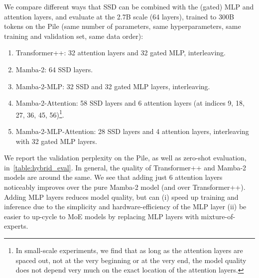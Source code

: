 \documentclass{article}
\begin{document}
We compare different ways that SSD can be combined with the (gated) MLP and attention layers, and evaluate at the 2.7B scale (64 layers), trained to 300B tokens on the Pile (same
number of parameters, same hyperparameters, same training and validation set, same data order):
\begin{enumerate}
\item Transformer++: 32 attention layers and 32 gated MLP, interleaving.
\item Mamba-2: 64 SSD layers.
\item Mamba-2-MLP: 32 SSD and 32 gated MLP layers, interleaving.
\item Mamba-2-Attention: 58 SSD layers and 6 attention layers (at indices 9, 18, 27, 36, 45, 56)\footnote{In small-scale experiments, we find that as long as the attention layers are spaced out, not at the very beginning or at the very end, the model quality does not depend very much on the exact location of the attention layers.}.
\item Mamba-2-MLP-Attention: 28 SSD layers and 4 attention layers, interleaving with 32 gated MLP layers.
\end{enumerate}
We report the validation perplexity on the Pile, as well as zero-shot evaluation, in~\cref{table:hybrid_eval}.
In general, the quality of Transformer++ and Mamba-2 models are around the same.
We see that adding just 6 attention layers noticeably improves over the pure Mamba-2 model (and over Transformer++). Adding MLP layers reduces model quality, but can (i) speed up training and inference due to the simplicity and hardware-efficiency of the MLP layer (ii) be easier to up-cycle to MoE models by replacing MLP layers with mixture-of-experts.
\end{document}
